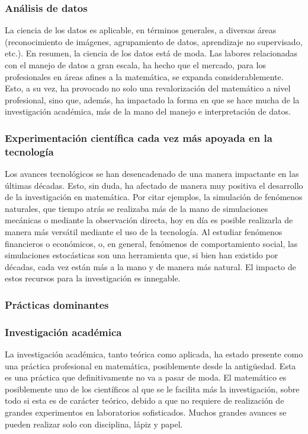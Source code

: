 \subsubsection*{Análisis de datos}

La ciencia de los datos es aplicable, en términos generales, a diversas áreas (reconocimiento de imágenes, agrupamiento de datos, aprendizaje no supervisado, etc.). En resumen, la ciencia de
los datos está de moda. Las labores relacionadas con el manejo de datos a gran escala, ha hecho que el mercado, para los profesionales en áreas afines a la matemática, se expanda considerablemente. Esto, a su vez, ha provocado no solo una revalorización del matemático a nivel profesional, sino que, además, ha impactado la forma en que se hace mucha de la investigación académica, más de la mano del manejo e interpretación de datos. 

\subsubsection*{Experimentación científica cada vez más apoyada en la tecnología}

Los avances tecnológicos se han desencadenado de una manera impactante en las últimas décadas. Esto, sin duda, ha afectado de manera muy positiva el desarrollo de la investigación en matemática. Por citar ejemplos, la simulación de fenómenos naturales, que tiempo atrás se realizaba más de la mano de simulaciones mecánicas o mediante la observación directa, hoy en día es posible realizarla de manera más versátil mediante el uso de la tecnología. Al estudiar fenómenos financieros o económicos, o, en general, fenómenos de comportamiento social, las simulaciones estocásticas son una herramienta que, si bien han existido por décadas, cada vez están más a la mano y de manera más natural. El impacto de estos recursos para la investigación es innegable. 

\subsubsection{Prácticas dominantes}

\subsubsection*{Investigación académica}

La investigación académica, tanto teórica como aplicada, ha estado presente como una práctica profesional en matemática, posiblemente desde la antigüedad. Esta es una práctica que definitivamente no va a pasar de moda. El matemático es posiblemente uno de los científicos al que se le facilita más la investigación, sobre todo si esta es de carácter teórico, debido a que no requiere de realización de grandes experimentos en laboratorios sofisticados. Muchos grandes avances se pueden realizar solo con disciplina, lápiz y papel. 


